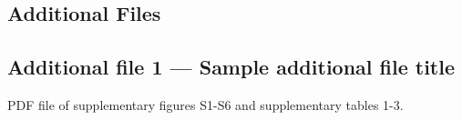\documentclass[doublespacing]{bmcart}
\begin{document}
\begin{backmatter}



\section*{Additional Files}
  \subsection*{Additional file 1 --- Sample additional file title}
    PDF file of supplementary figures S1-S6 and supplementary tables 1-3.



\end{backmatter}
\end{document}
